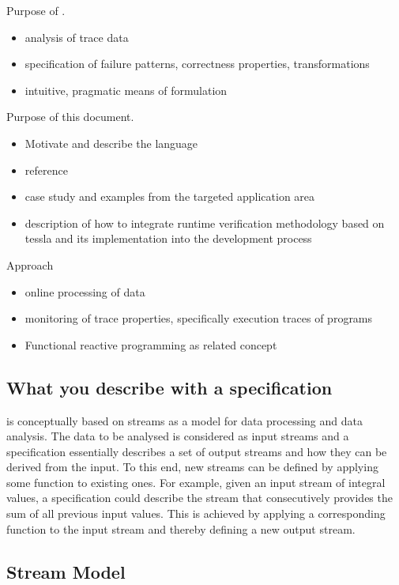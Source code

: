 Purpose of \tessla.

\begin{itemize}
  \item analysis of trace data
  \item specification of failure patterns, correctness properties, transformations
  \item intuitive, pragmatic means of formulation 
\end{itemize}

Purpose of this document.
\begin{itemize}
  \item Motivate and describe the language
  \item reference
  \item case study and examples from the targeted application area
  \item description of how to integrate runtime verification methodology based on tessla and its implementation into the development process
\end{itemize}

Approach
  \begin{itemize}
    \item online processing of data
    \item monitoring of trace properties, specifically execution traces of programs
    \item Functional reactive programming as related concept
  \end{itemize}

\subsection{What you describe with a \tessla specification}

\tessla is conceptually based on streams as a model for data processing and data analysis. 
The data to be analysed is considered as input streams and a \tessla specification essentially describes a set of output streams and how they can be derived from the input.
To this end, new streams can be defined by applying some function to existing ones.
For example, given an input stream of integral values, a \tessla specification could describe the stream that consecutively provides the sum of all previous input values.
This is achieved by applying a corresponding function to the input stream and thereby defining a new output stream.

\subsection{Stream Model}
\label{sec:streams}

